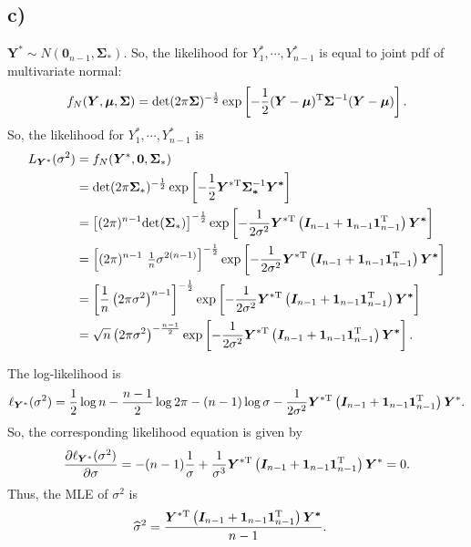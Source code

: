 \documentclass[a4paper]{article}
\begin{document}
\vspace{\baselineskip}
\subsection{c)}
$\bm{Y}^{*} \sim N\left(\bm{0}_{n-1}, \bm{\Sigma}_{*}\right)$. So, the likelihood for $Y_{1}^{*}, \cdots, Y_{n-1}^{*}$ is equal to joint pdf of multivariate normal:
\begin{align*}
f_{N}(\bm{Y}, \bm{\mu}, \bm{\Sigma}) = \mathrm{det}(2\pi\bm{\Sigma})^{-\frac{1}{2}}\exp\left[-\frac {1}{2}(\bm{Y}-\bm{\mu})^{\rm T}\bm{\Sigma}^{-1}(\bm{Y}-\bm{\mu})\right].
\end{align*}
So, the likelihood for $Y_{1}^{*}, \cdots, Y_{n-1}^{*}$ is
\begin{align*}
L_{\bm{Y}^{*}}(\sigma^{2}) &= f_{N}(\bm{Y}^{*}, \bm{0}, \bm{\Sigma}_{*})\\
&= \mathrm{det}(2\pi\bm{\Sigma}_{*})^{-\frac{1}{2}}\exp\left[-\frac {1}{2}\bm{Y}^{*{\rm T}}\bm{\Sigma_{*}}^{-1}\bm{Y^{*}}\right]\\
&= \left[(2\pi)^{n-1}\mathrm{det}(\bm{\Sigma}_{*})\right]^{-\frac{1}{2}}\exp\left[-\frac {1}{2\sigma^{2}}\bm{Y}^{*{\rm T}}\left(\bm{I}_{n-1} + \bm{1}_{n-1}\bm{1}_{n-1}^{\rm T}\right)\bm{Y^{*}}\right]\\
&= \left[(2\pi)^{n-1}\,\,\tfrac{1}{n} \sigma^{2(n-1)}\right]^{-\frac{1}{2}}\exp\left[-\frac {1}{2\sigma^{2}}\bm{Y}^{*{\rm T}}\left(\bm{I}_{n-1} + \bm{1}_{n-1}\bm{1}_{n-1}^{\rm T}\right)\bm{Y^{*}}\right]\\
&= \left[\frac{1}{n}\left(2\pi\sigma^{2}\right)^{n-1}\right]^{-\frac{1}{2}}\exp\left[-\frac {1}{2\sigma^{2}}\bm{Y}^{*{\rm T}}\left(\bm{I}_{n-1} + \bm{1}_{n-1}\bm{1}_{n-1}^{\rm T}\right)\bm{Y^{*}}\right]\\
&= \sqrt{n}\left(2\pi\sigma^{2}\right)^{-\frac{n-1}{2}}\exp\left[-\frac {1}{2\sigma^{2}}\bm{Y}^{*{\rm T}}\left(\bm{I}_{n-1} + \bm{1}_{n-1}\bm{1}_{n-1}^{\rm T}\right)\bm{Y^{*}}\right].
\end{align*}

The log-likelihood is
\begin{align*}
\ell_{\bm{Y}^{*}}(\sigma^{2}) = \frac{1}{2}\log{n} -\frac{n-1}{2}\log{2\pi} -(n-1)\log{\sigma} -\frac {1}{2\sigma^{2}}\bm{Y}^{*{\rm T}}\left(\bm{I}_{n-1} + \bm{1}_{n-1}\bm{1}_{n-1}^{\rm T}\right)\bm{Y}^{*}.
\end{align*}
So, the corresponding likelihood equation is given by
\begin{align*}
\frac{\partial \ell_{\bm{Y}^{*}}(\sigma^{2})}{\partial \sigma} = -(n-1) \frac{1}{\sigma}+ \frac {1}{\sigma^{3}}\bm{Y}^{*{\rm T}}\left(\bm{I}_{n-1} + \bm{1}_{n-1}\bm{1}_{n-1}^{\rm T}\right)\bm{Y}^{*}=0.
\end{align*}
Thus, the MLE of $\sigma^{2}$ is
\begin{align*}
\widehat{\sigma}^{2} &= \frac{\bm{Y}^{*{\rm T}}\left(\bm{I}_{n-1} + \bm{1}_{n-1}\bm{1}_{n-1}^{\rm T}\right)\bm{Y^{*}}}{n-1}.
\end{align*}
\end{document}
